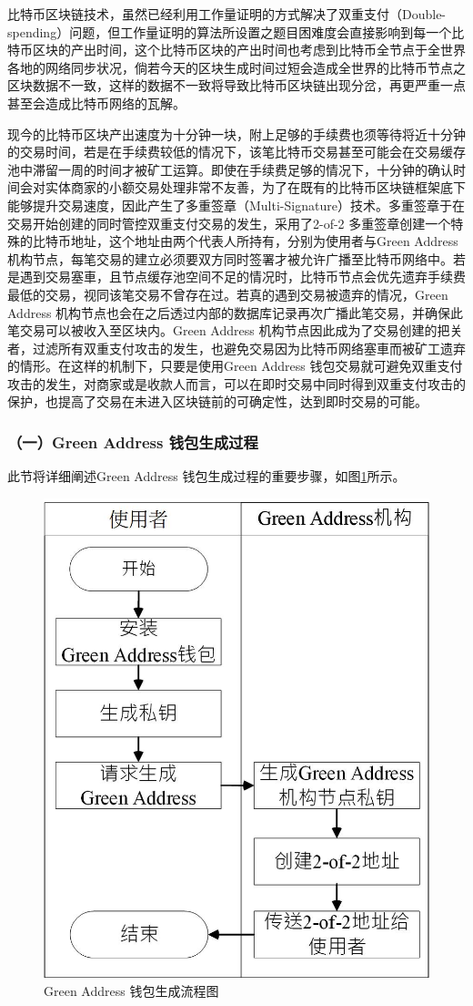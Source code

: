 			 	比特币区块链技术，虽然已经利用工作量证明的方式解决了双重支付（Double-spending）问题\supercite{Informationpropagationinthebitcoinnetwork}\supercite{Double-spendingfastpaymentsinbitcoin}，但工作量证明的算法所设置之题目困难度会直接影响到每一个比特币区块的产出时间，这个比特币区块的产出时间也考虑到比特币全节点于全世界各地的网络同步状况，倘若今天的区块生成时间过短会造成全世界的比特币节点之区块数据不一致，这样的数据不一致将导致比特币区块链出现分岔，再更严重一点甚至会造成比特币网络的瓦解。

			 	现今的⽐特币区块产出速度为⼗分钟⼀块，附上⾜够的⼿续费也须等待将近⼗分钟的交易时间，若是在⼿续费较低的情况下，该笔⽐特币交易甚⾄可能会在交易缓存池中滞留⼀周的时间才被矿工运算。即使在⼿续费⾜够的情况下，⼗分钟的确认时间会对实体商家的⼩额交易处理⾮常不友善，为了在既有的⽐特币区块链框架底下能够提升交易速度，因此产生了多重签章（Multi-Signature）技术。多重签章于在交易开始创建的同时管控双重⽀付交易的发⽣，采⽤了2-of-2 多重签章创建⼀个特殊的⽐特币地址，这个地址由两个代表⼈所持有，分别为使⽤者与Green Address\supercite{GreenAddress}机构节点，每笔交易的建⽴必须要双⽅同时签署才被允许广播⾄⽐特币网络中。若是遇到交易塞⾞，且节点缓存池空间不⾜的情况时，⽐特币节点会优先遗弃⼿续费最低的交易，视同该笔交易不曾存在过。若真的遇到交易被遗弃的情况，Green Address 机构节点也会在之后透过内部的数据库记录再次广播此笔交易，并确保此笔交易可以被收⼊⾄区块内。Green Address 机构节点因此成为了交易创建的把关者，过滤所有双重⽀付攻击的发⽣，也避免交易因为⽐特币网络塞⾞⽽被矿⼯遗弃的情形。在这样的机制下，只要是使⽤Green Address 钱包交易就可避免双重⽀付攻击的发⽣，对商家或是收款⼈⽽⾔，可以在即时交易中同时得到双重⽀付攻击的保护，也提高了交易在未进⼊区块链前的可确定性，达到即时交易的可能。

			 	\subsubsection{（一）Green Address 钱包生成过程}
			 	此节将详细阐述Green Address 钱包生成过程的重要步骤，如图\ref{gabuild}所示。
			 	\begin{figure}[!htbp]
					\centering
					\includegraphics[width = .4\textwidth]{gabuild.jpg}
					\caption{Green Address 钱包生成流程图}\label{gabuild}
				\end{figure}

